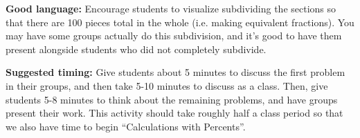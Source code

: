 \documentclass[nooutcomes,noauthor]{ximera}
\begin{document}
\begin{instructorNotes}
{\bf Good language:}  Encourage students to visualize subdividing the sections so that there are 100 pieces total in the whole (i.e. making equivalent fractions).  You may have some groups actually do this subdivision, and it's good to have them present alongside students who did not completely subdivide.


{\bf Suggested timing:} Give students about 5 minutes to discuss the first problem in their groups, and then take 5-10 minutes to discuss as a class. Then, give students 5-8 minutes to think about the remaining problems, and have groups present their work. This activity should take roughly half a class period so that we also have time to begin ``Calculations with Percents''.

\end{instructorNotes}
\end{document}
